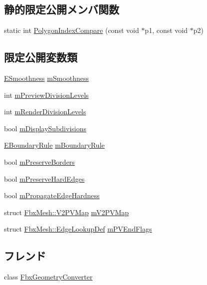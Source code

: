 \subsection*{静的限定公開メンバ関数}
\begin{DoxyCompactItemize}
\item 
static int \hyperlink{class_fbx_mesh_acbc149091e1be99e9555abbd81f03981}{Polygon\+Index\+Compare} (const void $\ast$p1, const void $\ast$p2)
\end{DoxyCompactItemize}
\subsection*{限定公開変数類}
\begin{DoxyCompactItemize}
\item 
\hyperlink{class_fbx_mesh_a7ac812140810290f718863c170279cf3}{E\+Smoothness} \hyperlink{class_fbx_mesh_ac4b9e270e53db167213a43bfa49e2d2b}{m\+Smoothness}
\item 
int \hyperlink{class_fbx_mesh_abf407e3dc0f8e13664528fcadd5035ee}{m\+Preview\+Division\+Levels}
\item 
int \hyperlink{class_fbx_mesh_a1c5f079f731567bbbc1b5af7527e6aa6}{m\+Render\+Division\+Levels}
\item 
bool \hyperlink{class_fbx_mesh_ae9005285762c3272f560c2f63a398cd4}{m\+Display\+Subdivisions}
\item 
\hyperlink{class_fbx_mesh_ab9e7d41ffcd49467a374c72e0d6f3561}{E\+Boundary\+Rule} \hyperlink{class_fbx_mesh_a18ab74b81af5df2f4e1b4a02c84f56b8}{m\+Boundary\+Rule}
\item 
bool \hyperlink{class_fbx_mesh_a05de09199525ca131c28f4f8eed8260e}{m\+Preserve\+Borders}
\item 
bool \hyperlink{class_fbx_mesh_ad87b5da0ae447da265cef23b479f3a79}{m\+Preserve\+Hard\+Edges}
\item 
bool \hyperlink{class_fbx_mesh_a1ff440a236f927098cfbb41c46fb2b59}{m\+Propagate\+Edge\+Hardness}
\item 
struct \hyperlink{struct_fbx_mesh_1_1_v2_p_v_map}{Fbx\+Mesh\+::\+V2\+P\+V\+Map} \hyperlink{class_fbx_mesh_ad0d46d5f839a3b62fe97684629bfa639}{m\+V2\+P\+V\+Map}
\item 
struct \hyperlink{struct_fbx_mesh_1_1_edge_lookup_def}{Fbx\+Mesh\+::\+Edge\+Lookup\+Def} \hyperlink{class_fbx_mesh_af8a2af0c1c6432f6ca488a8eaeda722e}{m\+P\+V\+End\+Flags}
\end{DoxyCompactItemize}
\subsection*{フレンド}
\begin{DoxyCompactItemize}
\item 
class \hyperlink{class_fbx_mesh_a2c65afd59c2bab21d92824fbe4422545}{Fbx\+Geometry\+Converter}
\end{DoxyCompactItemize}
